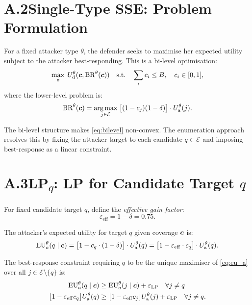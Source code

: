 \section*{A.2\quad Single-Type SSE: Problem Formulation}

For a fixed attacker type $\theta$, the defender seeks to maximise her
expected utility subject to the attacker best-responding.  This is a
bi-level optimisation:
\begin{equation}
  \max_{\bm{c}} \; U_{\mathrm{d}}^\theta(\bm{c}, \mathrm{BR}^\theta(\bm{c}))
  \quad \text{s.t.} \quad
  \sum_i c_i \leq B, \quad c_i \in [0,1],
  \label{eq:bilevel}
\end{equation}
where the lower-level problem is:
\begin{equation}
  \mathrm{BR}^\theta(\bm{c}) = \operatorname*{arg\,max}_{j \in \mathcal{E}} \;
    \bigl[(1 - c_j)(1 - \delta)\bigr] \cdot U_{\mathrm{a}}^\theta(j).
  \label{eq:br}
\end{equation}

The bi-level structure makes \cref{eq:bilevel} non-convex.  The
enumeration approach resolves this by fixing the attacker target to
each candidate $q \in \mathcal{E}$ and imposing best-response as a
linear constraint.

\section*{A.3\quad LP\textsubscript{$q$}: LP for Candidate Target $q$}

For fixed candidate target $q$, define the \emph{effective gain factor}:
\begin{equation}
  \varepsilon_\mathrm{eff} = 1 - \delta = 0.75.
\end{equation}

The attacker's expected utility for target $q$ given coverage $\bm{c}$ is:
\begin{equation}
  \mathrm{EU}_a^\theta(q \mid \bm{c}) = \bigl[1 - c_q \cdot (1 - \delta)\bigr]
    \cdot U_{\mathrm{a}}^\theta(q) = \bigl[1 - \varepsilon_\mathrm{eff} \cdot c_q\bigr]
    \cdot U_{\mathrm{a}}^\theta(q).
  \label{eq:eu_a}
\end{equation}

The best-response constraint requiring $q$ to be the unique maximiser
of \cref{eq:eu_a} over all $j \in \mathcal{E} \setminus \{q\}$ is:
\begin{align}
  \mathrm{EU}_a^\theta(q \mid \bm{c}) &\geq \mathrm{EU}_a^\theta(j \mid \bm{c})
  + \varepsilon_\mathrm{LP} \quad \forall j \neq q \notag \\
  \bigl[1 - \varepsilon_\mathrm{eff} c_q\bigr]U_{\mathrm{a}}^\theta(q) &\geq
  \bigl[1 - \varepsilon_\mathrm{eff} c_j\bigr]U_{\mathrm{a}}^\theta(j)
  + \varepsilon_\mathrm{LP} \quad \forall j \neq q. \notag
\end{align}

